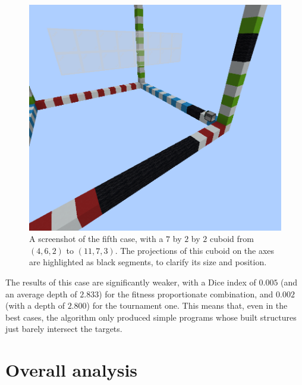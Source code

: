 \documentclass{report}
\begin{document}
\begin{figure}[H]
    \centering
    \includegraphics[scale=0.3]{minecraft6}
    \caption{A screenshot of the fifth case, with a $7$ by $2$ by $2$ cuboid from $(4, 6, 2)$ to $(11, 7, 3)$. The projections of this cuboid on the axes are highlighted as black segments, to clarify its size and position.}
    \label{fig:case5_minecraft}
\end{figure}

The results of this case are significantly weaker, with a Dice index of $0.005$ (and an average depth of $2.833$) for the fitness proportionate combination, and $0.002$ (with a depth of $2.800$) for the tournament one. This means that, even in the best cases, the algorithm only produced simple programs whose built structures just barely intersect the targets.

\section{Overall analysis}
\end{document}
